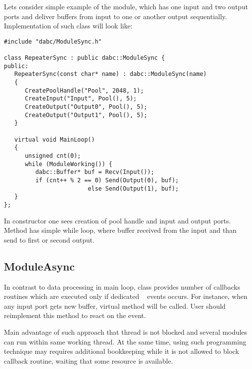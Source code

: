 Lets consider simple example of the module, 
which has one input and two output ports and deliver buffers from input to
one or another output sequentially. Implementation of such 
class will look like:
\begin{small}
\begin{verbatim}
#include "dabc/ModuleSync.h"

class RepeaterSync : public dabc::ModuleSync {
public:
   RepeaterSync(const char* name) : dabc::ModuleSync(name)
   {
      CreatePoolHandle("Pool", 2048, 1);
      CreateInput("Input", Pool(), 5);
      CreateOutput("Output0", Pool(), 5);
      CreateOutput("Output1", Pool(), 5);
   }
     
   virtual void MainLoop()
   {
      unsigned cnt(0);
      while (ModuleWorking()) {
         dabc::Buffer* buf = Recv(Input());
         if (cnt++ % 2 == 0) Send(Output(0), buf);
                        else Send(Output(1), buf);
   }
};
\end{verbatim}
\end{small}

In constructor one sees creation of pool handle and input and output ports.
Method  has simple while loop, where buffer received from the
input and than send to first or second output.
  
\subsection{ModuleAsync}
\label{plugin_module_async}

In contrast to data processing in  main loop,
class  provides 
number of callbacks routines which are executed only if dedicated \dabc~ events occurs.
For instance, when any input port gets new buffer, virtual method  will
be called. User should reimplement this method to react on the event.

Main advantage of such approach that thread is not blocked and
several modules  can run within same working thread.
At the same time, using such programming technique may requires additional 
bookkeeping while it is not allowed to block callback routine, waiting that
some resource is available.

